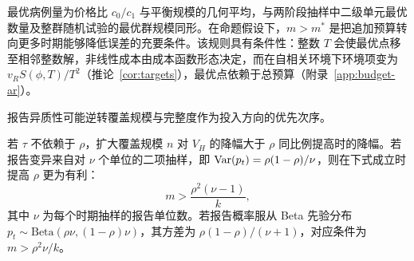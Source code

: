 最优病例量为价格比 $c_0/c_1$ 与平衡规模的几何平均，与两阶段抽样中二级单元最优数量及整群随机试验的最优群规模同形\citep{cochran1977sampling, raudenbush1997statistical}。在命题假设下，$m>m^*$ 是把追加预算转向更多时期能够降低误差的充要条件。该规则具有条件性：整数 $T$ 会使最优点移至相邻整数解，非线性成本由成本函数形态决定，而在自相关环境下环境项变为 $v_RS(\phi,T)/T^2$（推论~\ref{cor:targets}），最优点依赖于总预算（附录~\ref{app:budget-ar}）。

报告异质性可能逆转覆盖规模与完整度作为投入方向的优先次序。

\begin{corollary}[覆盖规模与报告完整度的比较]
\label{cor:switch}
若 $\tau$ 不依赖于 $\rho$，扩大覆盖规模 $n$ 对 $V_H$ 的降幅大于 $\rho$ 同比例提高时的降幅。若报告变异来自对 $\nu$ 个单位的二项抽样，即 $\mathrm{Var}(p_t)=\rho(1-\rho)/\nu$，则在下式成立时提高 $\rho$ 更为有利：
\begin{equation}
  m>\frac{\rho^2(\nu-1)}{k},
  \label{eq:r3-switch}
\end{equation}
其中 $\nu$ 为每个时期抽样的报告单位数。若报告概率服从 Beta 先验分布 $p_t\sim\mathrm{Beta}(\rho\nu,(1-\rho)\nu)$，其方差为 $\rho(1-\rho)/(\nu+1)$，对应条件为 $m>\rho^2\nu/k$。
\end{corollary}
